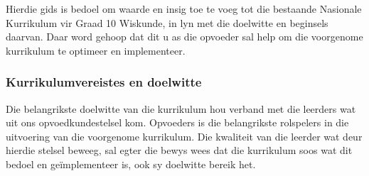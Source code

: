 Hierdie gids is bedoel om waarde en insig toe te voeg tot die
bestaande Nasionale Kurrikulum vir Graad 10 Wiskunde, in lyn met die
doelwitte en beginsels daarvan.
Daar word gehoop dat dit u as die opvoeder sal help om die voorgenome
kurrikulum te optimeer en implementeer.

\subsubsection{Kurrikulumvereistes en doelwitte}
Die belangrikste doelwitte van die kurrikulum hou verband met die
leerders wat uit ons opvoedkundestelsel kom.
Opvoeders is die belangrikste rolspelers in die uitvoering van die
voorgenome kurrikulum. Die kwaliteit van die leerder wat deur hierdie
stelsel beweeg, sal egter die bewys wees dat die kurrikulum soos wat
dit bedoel en ge\"{i}mplementeer is, ook sy doelwitte bereik het.


